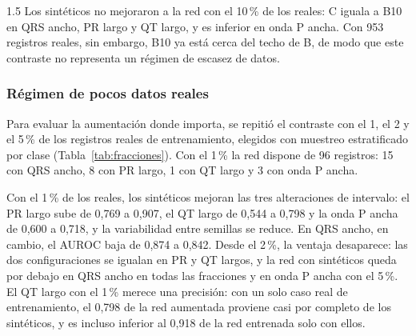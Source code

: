 \begin{spacing}{1.5}
Los sintéticos no mejoraron a la red con el 10\,\% de los reales: C iguala a B10 en QRS ancho, PR largo y QT largo, y es inferior en onda P ancha. Con 953 registros reales, sin embargo, B10 ya está cerca del techo de B, de modo que este contraste no representa un régimen de escasez de datos.

\subsubsection{Régimen de pocos datos reales}

Para evaluar la aumentación donde importa, se repitió el contraste con el 1, el 2 y el 5\,\% de los registros reales de entrenamiento, elegidos con muestreo estratificado por clase (Tabla~\ref{tab:fracciones}). Con el 1\,\% la red dispone de 96 registros: 15 con QRS ancho, 8 con PR largo, 1 con QT largo y 3 con onda P ancha.

\begin{table}[H]
\centering
{}
\caption{AUROC sobre los registros reales de prueba con pocos datos reales de entrenamiento, con y sin los 6.000 sintéticos, media $\pm$ desviación estándar sobre tres semillas.}
\label{tab:fracciones}
\end{table}

Con el 1\,\% de los reales, los sintéticos mejoran las tres alteraciones de intervalo: el PR largo sube de 0,769 a 0,907, el QT largo de 0,544 a 0,798 y la onda P ancha de 0,600 a 0,718, y la variabilidad entre semillas se reduce. En QRS ancho, en cambio, el AUROC baja de 0,874 a 0,842. Desde el 2\,\%, la ventaja desaparece: las dos configuraciones se igualan en PR y QT largos, y la red con sintéticos queda por debajo en QRS ancho en todas las fracciones y en onda P ancha con el 5\,\%. El QT largo con el 1\,\% merece una precisión: con un solo caso real de entrenamiento, el 0,798 de la red aumentada proviene casi por completo de los sintéticos, y es incluso inferior al 0,918 de la red entrenada solo con ellos.


\end{spacing}
